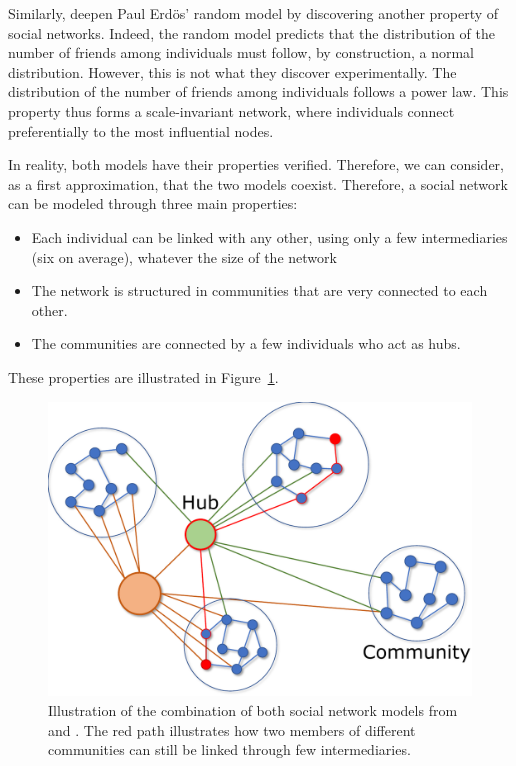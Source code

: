 Similarly, \textcite{barabasiEmergenceScalingRandom1999} deepen Paul Erdös' random model by discovering another property of social networks.
Indeed, the random model predicts that the distribution of the number of friends among individuals must follow, by construction, a normal distribution.
However, this is not what they discover experimentally.
The distribution of the number of friends among individuals follows a power law.
This property thus forms a scale-invariant network, where individuals connect preferentially to the most influential nodes.

In reality, both models have their properties verified.
Therefore, we can consider, as a first approximation, that the two models coexist.
Therefore, a social network can be modeled through three main properties:

\begin{itemize}
    \item Each individual can be linked with any other, using only a few intermediaries (six on average), whatever the size of the network
    \item The network is structured in communities that are very connected to each other.
    \item The communities are connected by a few individuals who act as hubs.
\end{itemize}

These properties are illustrated in Figure~\ref{context:social-network}.

\begin{figure}[htb]
    \centering
    \includegraphics[width=\textwidth]{figures/chap-1/network.pdf}
    \caption{Illustration of the combination of both social network models from \textcite{wattsCollectiveDynamicsSmallworld1998} and \textcite{barabasiEmergenceScalingRandom1999}. The red path illustrates how two members of different communities can still be linked through few intermediaries.}
    \label{context:social-network}
\end{figure}

